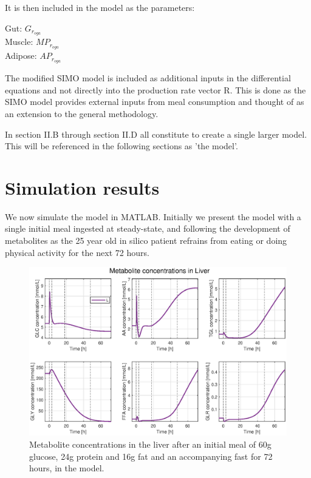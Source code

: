 \documentclass{IEEEtran}
\begin{document}
It is then included in the model as the parameters:
\begin{center}
    Gut: $G_{r_{oga}}$ \\
    Muscle: $MP_{r_{oga}}$ \\
    Adipose: $AP_{r_{oga}}$
\end{center}

The modified SIMO model is included as additional inputs in the differential equations and not directly into the production rate vector R. This is done as the SIMO model provides external inputs from meal consumption and thought of as an extension to the general methodology.






In section II.B through section II.D all constitute to create a single larger model. This will be referenced in the following sections as 'the model'.


\section{Simulation results}
\label{sec:simulationresults}

We now simulate the model in MATLAB. Initially we present the model with a single initial meal ingested at steady-state, and following the development of metabolites as the 25 year old in silico patient refrains from eating or doing physical activity for the next 72 hours. \\





\begin{figure}[H]
    \centering
    \includegraphics[trim=35 10 35 0, width=\columnwidth]{Diagrams/Fasting/liver_metabolites.eps}
    \caption{Metabolite concentrations in the liver after an initial meal of 60g glucose, 24g protein and 16g fat and an accompanying fast for 72 hours, in the model.}
    \label{fig:Liver_metabolites}
\end{figure}
\end{document}
